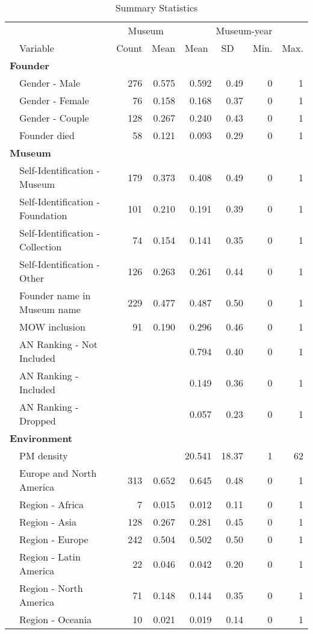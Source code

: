 \documentclass[12pt]{article}
\begin{document}
\begin{table}[ht]
\centering
\begin{tabular}{llrrrrrr}
  \hline
 & & \multicolumn{2}{c}{Museum} & \multicolumn{4}{c}{Museum-year} \\ 
\cmidrule(r){3-4}\cmidrule(r){5-8} \multicolumn{1}{l}{} & \multicolumn{1}{l}{Variable} & \multicolumn{1}{l}{Count} & \multicolumn{1}{l}{Mean} & \multicolumn{1}{l}{Mean} & \multicolumn{1}{l}{SD} & \multicolumn{1}{l}{Min.} & \multicolumn{1}{l}{Max.}\\ 
 \hline
  \multicolumn{8}{l}{\textbf{Founder}} \\ 
 & Gender - Male & 276 & 0.575 &  0.592 &  0.49 & 0 &  1 \\ 
   & Gender - Female & 76 & 0.158 &  0.168 &  0.37 & 0 &  1 \\ 
   & Gender - Couple & 128 & 0.267 &  0.240 &  0.43 & 0 &  1 \\ 
   & Founder died & 58 & 0.121 &  0.093 &  0.29 & 0 &  1 \\ 
   \multicolumn{8}{l}{\textbf{Museum}} \\ 
 & Self-Identification - Museum & 179 & 0.373 &  0.408 &  0.49 & 0 &  1 \\ 
   & Self-Identification - Foundation & 101 & 0.210 &  0.191 &  0.39 & 0 &  1 \\ 
   & Self-Identification - Collection & 74 & 0.154 &  0.141 &  0.35 & 0 &  1 \\ 
   & Self-Identification - Other & 126 & 0.263 &  0.261 &  0.44 & 0 &  1 \\ 
   & Founder name in Museum name & 229 & 0.477 &  0.487 &  0.50 & 0 &  1 \\ 
   & MOW inclusion & 91 & 0.190 &  0.296 &  0.46 & 0 &  1 \\ 
   & AN Ranking - Not Included &  &  &  0.794 &  0.40 & 0 &  1 \\ 
   & AN Ranking - Included &  &  &  0.149 &  0.36 & 0 &  1 \\ 
   & AN Ranking - Dropped &  &  &  0.057 &  0.23 & 0 &  1 \\ 
   \multicolumn{8}{l}{\textbf{Environment}} \\ 
 & PM density &  &  & 20.541 & 18.37 & 1 & 62 \\ 
   & Europe and North America & 313 & 0.652 &  0.645 &  0.48 & 0 &  1 \\ 
   & Region - Africa & 7 & 0.015 &  0.012 &  0.11 & 0 &  1 \\ 
   & Region - Asia & 128 & 0.267 &  0.281 &  0.45 & 0 &  1 \\ 
   & Region - Europe & 242 & 0.504 &  0.502 &  0.50 & 0 &  1 \\ 
   & Region - Latin America & 22 & 0.046 &  0.042 &  0.20 & 0 &  1 \\ 
   & Region - North America & 71 & 0.148 &  0.144 &  0.35 & 0 &  1 \\ 
   & Region - Oceania & 10 & 0.021 &  0.019 &  0.14 & 0 &  1 \\ 
   \hline
\end{tabular}
\caption{Summary Statistics} 
\label{tbl:t_sumstats}
\end{table}
\end{document}
